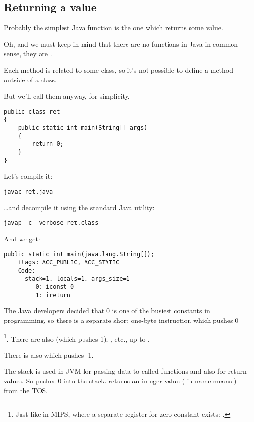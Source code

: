 \subsection{Returning a value}

Probably the simplest Java function is the one which returns some value.

Oh, and we must keep in mind that there are no  functions in Java in common sense,
they are . 

Each method is related to some class, so it's not possible to define
a method outside of a class.

But we'll call them  anyway, for simplicity.

\begin{lstlisting}[style=customjava]
public class ret
{
	public static int main(String[] args) 
	{
		return 0;
	}
}
\end{lstlisting}

Let's compile it:

\begin{lstlisting}
javac ret.java
\end{lstlisting}

\dots and decompile it using the standard Java utility:

\begin{lstlisting}
javap -c -verbose ret.class
\end{lstlisting}

And we get:

\begin{lstlisting}[caption=JDK 1.7 (excerpt)]
  public static int main(java.lang.String[]);
    flags: ACC_PUBLIC, ACC_STATIC
    Code:
      stack=1, locals=1, args_size=1
         0: iconst_0      
         1: ireturn       
\end{lstlisting}

The Java developers decided that 0 is one of the busiest constants in programming, 
so there is a separate short one-byte  instruction which pushes 0

\footnote{Just like in MIPS, where a separate register for zero constant exists: .}.
There are also  (which pushes 1), , etc., up to .

There is also  which pushes -1.

The stack is used in JVM for passing data to called functions and also for return values.
So  pushes 0 into the stack.
 returns an integer value ( in name means ) from the \ac{TOS}.

